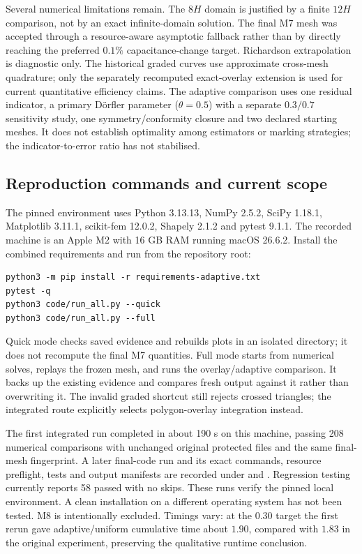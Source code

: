 \documentclass[11pt]{article}
\begin{document}
Several numerical limitations remain. The $8H$ domain is justified by a finite $12H$ comparison, not by an exact infinite-domain solution. The final M7 mesh was accepted through a resource-aware asymptotic fallback rather than by directly reaching the preferred $0.1\%$ capacitance-change target. Richardson extrapolation is diagnostic only. The historical graded curves use approximate cross-mesh quadrature; only the separately recomputed exact-overlay extension is used for current quantitative efficiency claims. The adaptive comparison uses one residual indicator, a primary D\"orfler parameter ($\theta=0.5$) with a separate $0.3/0.7$ sensitivity study, one symmetry/conformity closure and two declared starting meshes. It does not establish optimality among estimators or marking strategies; the indicator-to-error ratio has not stabilised.

\subsection*{Reproduction commands and current scope}
The pinned environment uses Python 3.13.13, NumPy 2.5.2, SciPy 1.18.1, Matplotlib 3.11.1, scikit-fem 12.0.2, Shapely 2.1.2 and pytest 9.1.1. The recorded machine is an Apple M2 with 16 GB RAM running macOS 26.6.2. Install the combined requirements and run from the repository root:
\begin{verbatim}
python3 -m pip install -r requirements-adaptive.txt
pytest -q
python3 code/run_all.py --quick
python3 code/run_all.py --full
\end{verbatim}
Quick mode checks saved evidence and rebuilds plots in an isolated directory; it does not recompute the final M7 quantities. Full mode starts from numerical solves, replays the frozen mesh, and runs the overlay/adaptive comparison. It backs up the existing evidence and compares fresh output against it rather than overwriting it. The invalid graded shortcut still rejects crossed triangles; the integrated route explicitly selects polygon-overlay integration instead.

The first integrated run completed in about 190 s on this machine, passing 208 numerical comparisons with unchanged original protected files and the same final-mesh fingerprint. A later final-code run and its exact commands, resource preflight, tests and output manifests are recorded under  and . Regression testing currently reports 58 passed with no skips. These runs verify the pinned local environment. A clean installation on a different operating system has not been tested. M8 is intentionally excluded. Timings vary: at the $0.30$ target the first rerun gave adaptive/uniform cumulative time about $1.90$, compared with $1.83$ in the original experiment, preserving the qualitative runtime conclusion.
\end{document}
